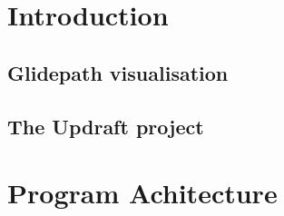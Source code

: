 \documentclass[12pt,a4paper]{refart}
\begin{document}
\clearpage


\section{Introduction}

\subsection{Glidepath visualisation}

\subsection{The Updraft project}




\clearpage





\clearpage







\clearpage

\section{Program Achitecture}


\end{document}
